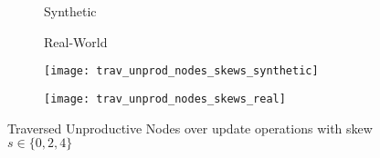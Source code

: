 \documentclass[abstracton,12pt]{scrartcl}
\theoremstyle{definition}
\begin{document}


\begin{figure}[H]
  \centering
  \begin{subfigure}{0.49\linewidth}
    \centering
    Synthetic
  \end{subfigure}
  \begin{subfigure}{0.49\linewidth}
    \centering
    Real-World
  \end{subfigure}
  \begin{subfigure}{0.49\linewidth}
    \centering
    \texttt{[image: trav\_unprod\_nodes\_skews\_synthetic]}
    \caption{}
    \label{fig:trav_unprod_nodes_skews_synthetic}
  \end{subfigure}
  \begin{subfigure}{0.49\linewidth}
    \centering
    \texttt{[image: trav\_unprod\_nodes\_skews\_real]}
    \caption{}
    \label{fig:trav_unprod_nodes_skews_real}
  \end{subfigure}
  \caption{Traversed Unproductive Nodes over update operations with skew $s \in \{0,2,4\}$}
\end{figure}
\end{document}
